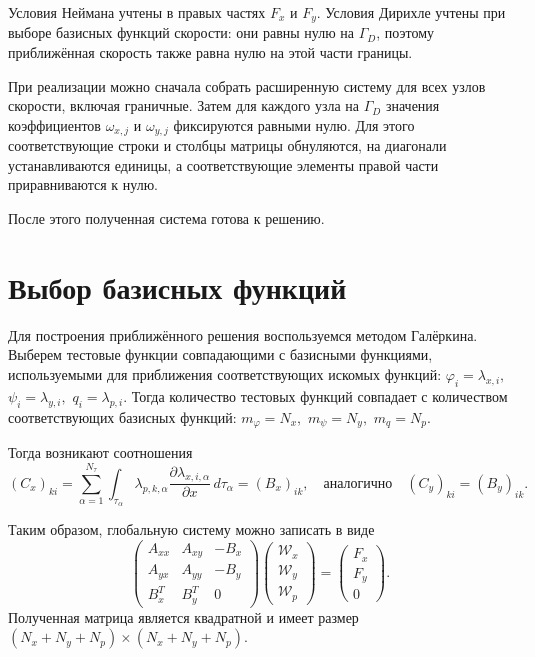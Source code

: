 \documentclass[a4paper,14pt]{extarticle}
\begin{document}
Условия Неймана учтены в правых частях $F_x$ и $F_y$.
Условия Дирихле учтены при выборе базисных функций скорости:
они равны нулю на $\Gamma_D$, поэтому приближённая скорость
также равна нулю на этой части границы.

При реализации можно сначала собрать расширенную систему
для всех узлов скорости, включая граничные. Затем для
каждого узла на $\Gamma_D$ значения коэффициентов
$\omega_{x,j}$ и $\omega_{y,j}$ фиксируются равными нулю.
Для этого соответствующие строки и столбцы матрицы
обнуляются, на диагонали устанавливаются единицы, а
соответствующие элементы правой части приравниваются к нулю.

После этого полученная система готова к решению.




\section{Выбор базисных функций}

Для построения приближённого решения воспользуемся методом
Галёркина. Выберем тестовые функции совпадающими с базисными
функциями, используемыми для приближения соответствующих
искомых функций:
$
	\varphi_i=\lambda_{x,i},
$ 
$
\psi_i=\lambda_{y,i},
$
$
	q_i=\lambda_{p,i}.
$
Тогда количество тестовых функций совпадает с количеством
соответствующих базисных функций:
$
	m_\varphi=N_x,
$
$
	m_\psi=N_y,
$
$
	m_q=N_p.
$

Тогда возникают соотношения
\begin{equation}
		(C_x)_{ki}
		=
		\sum_{\alpha=1}^{N_\tau}
		\int_{\tau_\alpha}
		\lambda_{p,k,\alpha}
		\frac{\partial\lambda_{x,i,\alpha}}{\partial x}
		\,d\tau_\alpha
		=
		(B_x)_{ik},
		\quad \text{аналогично} \quad
		(C_y)_{ki}
		=
		(B_y)_{ik}.
\end{equation}

Таким образом, глобальную систему можно записать в виде
\begin{equation}
	\begin{pmatrix}
		A_{xx} & A_{xy} & -B_x\\
		A_{yx} & A_{yy} & -B_y\\
		B_x^T & B_y^T & 0
	\end{pmatrix}
	\begin{pmatrix}
		\mathcal W_x\\
		\mathcal W_y\\
		\mathcal W_p
	\end{pmatrix}
	=
	\begin{pmatrix}
		F_x\\
		F_y\\
		0
	\end{pmatrix}.
\end{equation}
Полученная матрица является квадратной и имеет размер
$(N_x+N_y+N_p)\times(N_x+N_y+N_p)$.
\end{document}

